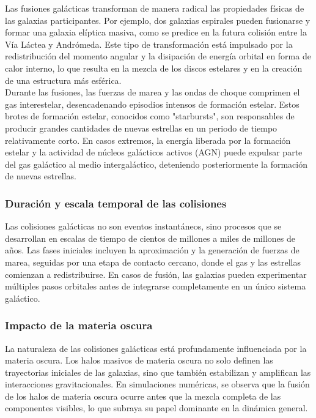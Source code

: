\documentclass{article}
\begin{document}
Las fusiones galácticas transforman de manera radical las propiedades físicas de las galaxias participantes. Por ejemplo, dos galaxias espirales pueden fusionarse y formar una galaxia elíptica masiva, como se predice en la futura colisión entre la Vía Láctea y Andrómeda. Este tipo de transformación está impulsado por la redistribución del momento angular y la disipación de energía orbital en forma de calor interno, lo que resulta en la mezcla de los discos estelares y en la creación de una estructura más esférica. \\

Durante las fusiones, las fuerzas de marea y las ondas de choque comprimen el gas interestelar, desencadenando episodios intensos de formación estelar. Estos brotes de formación estelar, conocidos como "starbursts", son responsables de producir grandes cantidades de nuevas estrellas en un periodo de tiempo relativamente corto. En casos extremos, la energía liberada por la formación estelar y la actividad de núcleos galácticos activos (AGN) puede expulsar parte del gas galáctico al medio intergaláctico, deteniendo posteriormente la formación de nuevas estrellas. \\

\subsubsection{Duración y escala temporal de las colisiones}
Las colisiones galácticas no son eventos instantáneos, sino procesos que se desarrollan en escalas de tiempo de cientos de millones a miles de millones de años. Las fases iniciales incluyen la aproximación y la generación de fuerzas de marea, seguidas por una etapa de contacto cercano, donde el gas y las estrellas comienzan a redistribuirse. En casos de fusión, las galaxias pueden experimentar múltiples pasos orbitales antes de integrarse completamente en un único sistema galáctico. \\

\subsubsection{Impacto de la materia oscura}
La naturaleza de las colisiones galácticas está profundamente influenciada por la materia oscura. Los halos masivos de materia oscura no solo definen las trayectorias iniciales de las galaxias, sino que también estabilizan y amplifican las interacciones gravitacionales. En simulaciones numéricas, se observa que la fusión de los halos de materia oscura ocurre antes que la mezcla completa de las componentes visibles, lo que subraya su papel dominante en la dinámica general. \\
\end{document}
